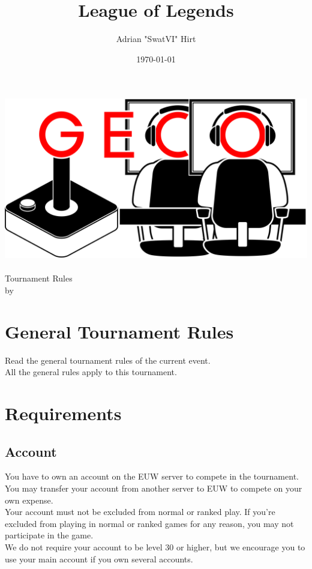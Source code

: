 \documentclass{article}
\title{League of Legends}
\author{Adrian "SwatVI" Hirt}
\date{\today}
\begin{document}
\makeatletter
\begin{titlepage}
\centering
\includegraphics[scale=0.075]{GECo.png}\\
\LARGE \@title\\ Tournament Rules\\ \normalsize by \@author\\ \@date
\end{titlepage}
\makeatother


\clearpage

\tableofcontents
\clearpage

\section{General Tournament Rules}
Read the general tournament rules of the current event.\\
All the general rules apply to this tournament.

\section{Requirements}
\subsection{Account}
You have to own an account on the EUW server to compete in the tournament. You may transfer your account from another server to EUW to compete on your own expense.
\\
Your account must not be excluded from normal or ranked play. If you're excluded from playing in normal or ranked games for any reason, you may not participate in the game.
\\
We do not require your account to be level 30 or higher, but we encourage you to use your main account if you own several accounts.
\end{document}
